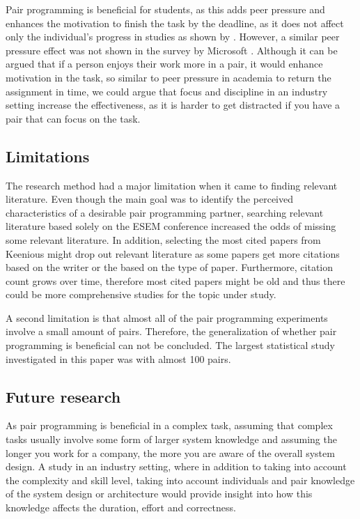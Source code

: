 \documentclass[conference]{IEEEtran}
\begin{document}
Pair programming is beneficial for students, as this adds peer pressure and enhances the motivation to finish the task by the deadline, as it does not affect only the individual's progress in studies as shown by \cite{Williams2000Strengthening}. However, a similar peer pressure effect was not shown in the survey by Microsoft \cite{10.1145/1414004.1414026}. Although it can be argued that if a person enjoys their work more in a pair, it would enhance motivation in the task, so similar to peer pressure in academia to return the assignment in time, we could argue that focus and discipline in an industry setting increase the effectiveness, as it is harder to get distracted if you have a pair that can focus on the task.


\subsection{Limitations}

The research method had a major limitation when it came to finding relevant literature. Even though the main goal was to identify the perceived characteristics of a desirable pair programming partner, searching relevant literature based solely on the ESEM conference increased the odds of missing some relevant literature. In addition, selecting the most cited papers from Keenious might drop out relevant literature as some papers get more citations based on the writer or the based on the type of paper. Furthermore, citation count grows over time, therefore most cited papers might be old and thus there could be more comprehensive studies for the topic under study.

A second limitation is that almost all of the pair programming experiments involve a small amount of pairs. Therefore, the generalization of whether pair programming is beneficial can not be concluded. The largest statistical study investigated in this paper was \cite{Arisholm2007Evaluating} with almost 100 pairs.


\subsection{Future research}

As pair programming is beneficial in a complex task, assuming that complex tasks usually involve some form of larger system knowledge and assuming the longer you work for a company, the more you are aware of the overall system design. A study in an industry setting, where in addition to taking into account the complexity and skill level, taking into account individuals and pair knowledge of the system design or architecture would provide insight into how this knowledge affects the duration, effort and correctness.
\end{document}

